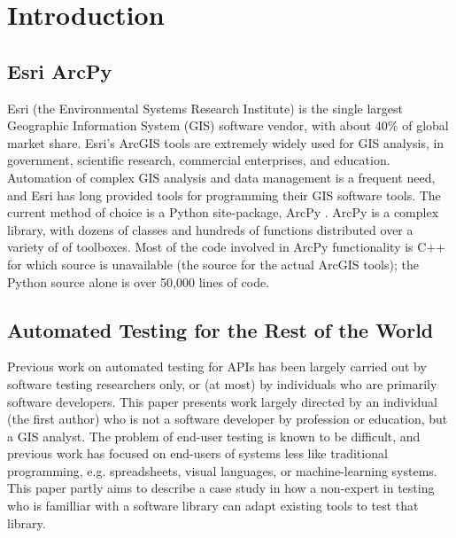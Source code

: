 \section{Introduction}

\subsection{Esri ArcPy}


Esri (the Environmental Systems Research Institute) is the single
largest Geographic Information System (GIS) software vendor, with about 40\%
of global market share.  Esri's ArcGIS tools are extremely widely
used for GIS analysis, in government, scientific research, commercial
enterprises, and education.  Automation of complex GIS analysis and
data management is a frequent need, and Esri has long provided tools
for programming their GIS software tools.  The current method of
choice is a Python site-package, ArcPy \cite{ArcPy}.  ArcPy is a complex library,
with dozens of classes and hundreds of functions distributed over
a variety of of toolboxes.  Most of the code involved in ArcPy
functionality is C++ for which source is unavailable (the source for
the actual ArcGIS tools); the Python source alone is over 50,000 lines
of code.

\subsection{Automated Testing for the Rest of the World}

Previous work on automated testing for APIs has been largely carried
out by software testing researchers only, or (at most) by individuals
who are primarily software developers.  This paper presents work
largely directed by an individual (the first author) who is not a
software developer by profession or education, but a GIS analyst.  The
problem of end-user testing \cite{burnettEUSE,Silos,rothermelTOSEM} is
known to be difficult, and previous work has focused on end-users of
systems less like traditional programming, e.g. spreadsheets, visual
languages, or machine-learning systems.  This paper partly aims to
describe a case study in how a non-expert in testing who is familliar
with a software library can adapt existing tools to test that library.